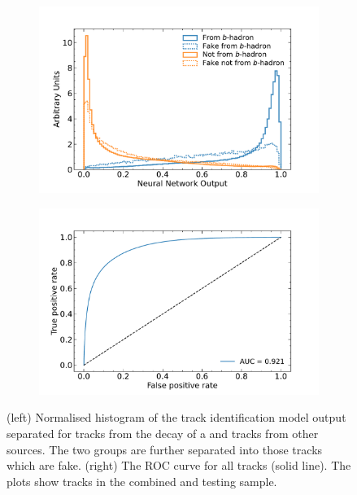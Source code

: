 
\begin{figure}[!htbp]
  \centering
  \begin{subfigure}[b]{0.48\textwidth}
      \centering
      \includegraphics[width=\textwidth]{chapters/track_classifier/figs/b_id_output.pdf}
  \end{subfigure}
  \quad
  \begin{subfigure}[b]{0.48\textwidth}
      \centering
      \includegraphics[width=\textwidth]{chapters/track_classifier/figs/b_id_roc.pdf}
  \end{subfigure}
  \caption{
    (left) Normalised histogram of the \bhadron track identification model output separated for tracks from the decay of a \bhadron and tracks from other sources.
    The two groups are further separated into those tracks which are fake.
    (right) The ROC curve for all tracks (solid line).
    The plots show tracks in the combined \ttbar and \Zprime testing sample.
  }
  \label{fig:b_id_output_roc}
\end{figure}


